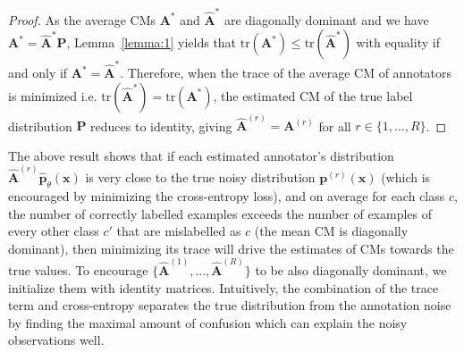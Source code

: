 \begin{proof}
As the average CMs $\textbf{A}^{*}$ and $\hat{\textbf{A}}^{*}$ are diagonally dominant and we have $\textbf{A}^{*}=\hat{\textbf{A}}^{*}\textbf{P}$, Lemma~\ref{lemma:1} yields that $\text{tr}(\textbf{A}^{*}) \leq \text{tr}(\hat{\textbf{A}}^{*}) $ with equality if and only if $\textbf{A}^{*} = \hat{\textbf{A}}^{*}$. Therefore, when the trace of the average CM of annotators is minimized i.e. $ \text{tr}(\hat{\textbf{A}}^{*})=\text{tr}(\textbf{A}^{*}) $, the estimated CM of the true label distribution $\textbf{P}$ reduces to identity, giving $\hat{\textbf{A}}^{(r)}= \textbf{A}^{(r)}$ for all $r \in \{1,...,R\}$. 
\end{proof}
\vspace{-2mm}
The above result shows that if each estimated annotator's distribution $\hat{\textbf{A}}^{(r)}\hat{\textbf{p}}_{\theta}(\mathbf{x})$ is very close to the true noisy distribution $\textbf{p}^{(r)}(\mathbf{x})$ (which is encouraged by minimizing the cross-entropy loss), and on average for each class $c$, the number of correctly labelled examples exceeds the number of examples of every other class $c'$ that are mislabelled as $c$ (the mean CM is diagonally dominant), then minimizing its trace will drive the estimates of CMs towards the true values. To encourage $\{\hat{\mathbf{A}}^{(1)}, ..., \hat{\mathbf{A}}^{(R)}\}$ to be also diagonally dominant, we initialize them with identity matrices. Intuitively, the combination of the trace term and cross-entropy separates the true distribution from the annotation noise by finding the maximal amount of confusion which can explain the noisy observations well. 




